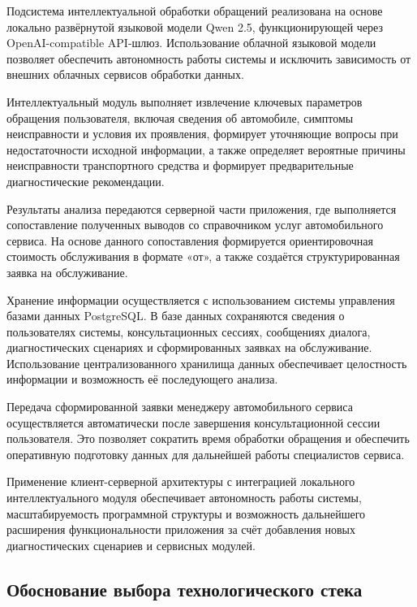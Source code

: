 \documentclass[14pt,a4paper]{extarticle}
\numberwithin{figure}{section}
\numberwithin{table}{section}
\begin{document}
Подсистема интеллектуальной обработки обращений реализована на основе
локально развёрнутой языковой модели Qwen 2.5, функционирующей через
OpenAI-compatible API-шлюз. Использование облачной языковой модели
позволяет обеспечить автономность работы системы и исключить зависимость
от внешних облачных сервисов обработки данных.

Интеллектуальный модуль выполняет извлечение ключевых параметров
обращения пользователя, включая сведения об автомобиле, симптомы
неисправности и условия их проявления, формирует уточняющие вопросы при
недостаточности исходной информации, а также определяет вероятные
причины неисправности транспортного средства и формирует предварительные
диагностические рекомендации.

Результаты анализа передаются серверной части приложения, где
выполняется сопоставление полученных выводов со справочником услуг
автомобильного сервиса. На основе данного сопоставления формируется
ориентировочная стоимость обслуживания в формате «от», а также создаётся
структурированная заявка на обслуживание.

Хранение информации осуществляется с использованием системы управления
базами данных PostgreSQL. В базе данных сохраняются сведения о
пользователях системы, консультационных сессиях, сообщениях диалога,
диагностических сценариях и сформированных заявках на обслуживание.
Использование централизованного хранилища данных обеспечивает
целостность информации и возможность её последующего анализа.

Передача сформированной заявки менеджеру автомобильного сервиса
осуществляется автоматически после завершения консультационной сессии
пользователя. Это позволяет сократить время обработки обращения и
обеспечить оперативную подготовку данных для дальнейшей работы
специалистов сервиса.

Применение клиент-серверной архитектуры с интеграцией локального
интеллектуального модуля обеспечивает автономность работы системы,
масштабируемость программной структуры и возможность дальнейшего
расширения функциональности приложения за счёт добавления новых
диагностических сценариев и сервисных модулей.

\subsection{Обоснование выбора технологического
стека}\label{ux43eux431ux43eux441ux43dux43eux432ux430ux43dux438ux435-ux432ux44bux431ux43eux440ux430-ux442ux435ux445ux43dux43eux43bux43eux433ux438ux447ux435ux441ux43aux43eux433ux43e-ux441ux442ux435ux43aux430}
\end{document}
